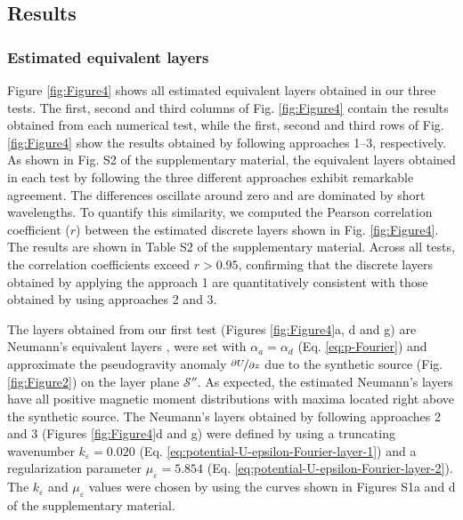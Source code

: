 \subsection{Results}

\subsubsection{Estimated equivalent layers}

Figure \ref{fig:Figure4} shows all estimated equivalent layers obtained in our three tests.
The first, second and third columns of Fig. \ref{fig:Figure4} contain the results obtained 
from each numerical test, while the first, second and third rows of Fig. \ref{fig:Figure4} 
show the results obtained by following approaches 1--3, respectively.
As shown in Fig. S2 of the supplementary material, the equivalent layers obtained in each test by 
following the three different approaches exhibit remarkable agreement.
The differences oscillate around zero and are dominated by short wavelengths.
To quantify this similarity, we computed the Pearson correlation coefficient ($r$) 
between the estimated discrete layers shown in Fig. \ref{fig:Figure4}. 
The results are shown in Table S2 of the supplementary material.
Across all tests, the correlation coefficients exceed $r > 0.95$, confirming that the discrete layers 
obtained by applying the approach 1 are quantitatively consistent with those obtained by using approaches 
2 and 3.

The layers obtained from our first test (Figures \ref{fig:Figure4}a, d and g) are Neumann's 
equivalent layers \citep{oliveirajr_etal2026_1}, 
were set with $\alpha_{a} = \alpha_{d}$ (Eq. \ref{eq:p-Fourier}) and approximate the
pseudogravity anomaly $\nicefrac{\partial U}{\partial z}$  
due to the synthetic source (Fig. \ref{fig:Figure2}) on the layer plane $\mathcal{S}''$.
As expected, the estimated Neumann's layers have all positive magnetic moment distributions 
with maxima located right above the synthetic source.
The Neumann's layers obtained by following approaches 2 and 3 
(Figures \ref{fig:Figure4}d and g) were defined by using a truncating wavenumber 
$k_{\varepsilon} = 0.020$ (Eq. \ref{eq:potential-U-epsilon-Fourier-layer-1})
and a regularization parameter $\mu_{\varepsilon} = 5.854$ 
(Eq. \ref{eq:potential-U-epsilon-Fourier-layer-2}). 
The $k_{\varepsilon}$ and $\mu_{\varepsilon}$ values were chosen by using the curves shown 
in Figures S1a and d of the supplementary material.

